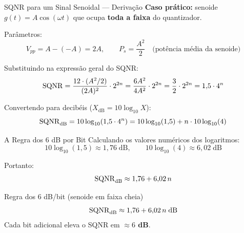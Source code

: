 
\begin{frame}{SQNR para um Sinal Senoidal — Derivação}
  \textbf{Caso prático:} senoide $g(t) = A\cos(\omega t)$ que ocupa
  \textbf{toda a faixa} do quantizador.

  \vspace{0.3cm}
  Parâmetros:
  \[
    V_{pp} = A - (-A) = 2A,
    \qquad
    P_s = \frac{A^2}{2}
    \quad\text{(potência média da senoide)}
  \]

  \vspace{0.3cm}
  Substituindo na expressão geral do SQNR:
  \[
    \mathrm{SQNR} = \frac{12\cdot(A^2/2)}{(2A)^2}\cdot 2^{2n}
           = \frac{6A^2}{4A^2}\cdot 2^{2n}
           = \frac{3}{2}\cdot 2^{2n}
           = 1{,}5\cdot 4^n
  \]

  \vspace{0.3cm}
  Convertendo para decibéis ($X_{\mathrm{dB}} = 10\log_{10}X$):
  \[
    \mathrm{SQNR}_{\mathrm{dB}}
    = 10\log_{10}\!\left(1{,}5\cdot 4^n\right)
    = 10\log_{10}(1{,}5) + n\cdot 10\log_{10}(4)
  \]
\end{frame}


\begin{frame}{A Regra dos 6 dB por Bit}
  Calculando os valores numéricos dos logaritmos:
  \[
    10\log_{10}(1{,}5) \approx 1{,}76\;\text{dB},
    \qquad
    10\log_{10}(4)     \approx 6{,}02\;\text{dB}
  \]

  \vspace{0.2cm}
  Portanto:
  \[
    \mathrm{SQNR}_{\mathrm{dB}} \approx 1{,}76 + 6{,}02\,n
  \]

  \begin{block}{Regra dos 6 dB/bit (senoide em faixa cheia)}
    \[
      \mathrm{SQNR}_{\mathrm{dB}} \approx 1{,}76 + 6{,}02\,n\;\text{dB}
    \]
    Cada bit adicional eleva o SQNR em \textbf{$\approx 6$ dB}.
  \end{block}
\end{frame}


